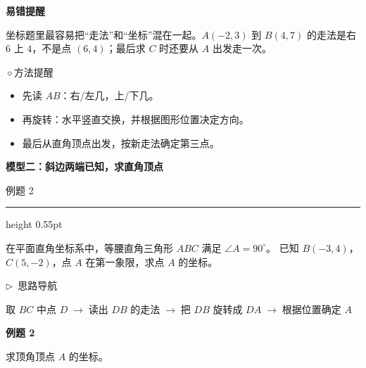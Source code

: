 \documentclass{exam-zh}
\newcommand{\edukai}{\kaishu}
\newcommand{\eduSectionTitle}[1]{%
  \needspace{5\baselineskip}%
  \vspace{2mm}
  {\color{edu-blue}\bfseries\large #1}\par
  \vspace{3mm}
}
\newcommand{\eduSubTitle}[1]{%
  \needspace{4\baselineskip}%
  \vspace{1mm}
  {\color{edu-blue}\bfseries #1}\par
  \vspace{1mm}
}
\newenvironment{eduSubQuestionItem}[1]{%
  \needspace{4\baselineskip}%
  \vspace{2mm}
  \par\noindent
  \hangindent=8mm\hangafter=1
  {\color{edu-blue}\bfseries #1}\enspace
  \begingroup
  \color{edu-ink}
}{%
  \endgroup
  \par
  \vspace{3mm}
}
\newenvironment{eduAuxItem}[1]{%
  \needspace{4\baselineskip}%
  \vspace{2mm}
  \par\noindent
  \hangindent=8mm\hangafter=1
  {\color{edu-blue}\edukai $\triangleright$~#1}\enspace
  \begingroup
  \color{edu-ink}
  \edukai
}{%
  \endgroup
  \par
  \vspace{4mm}
}
\newcommand{\eduIconPin}{\(\diamond\)}
\newenvironment{eduProblemBlock}[1][题目]{%
  \needspace{8\baselineskip}
  {\small\color{edu-muted}#1}\par
  \vspace{1.5mm}
  {\color{edu-blue}\hrule height 0.55pt}
  \vspace{4.5mm}
  \begingroup
  \color{edu-ink}
  \large
  \setlength{\parskip}{2.2mm}
  \linespread{1.20}\selectfont
}{%
  \par
  \endgroup
  \vspace{6mm}
}
\newenvironment{eduBulletList}{%
  \begin{itemize}[
    label=\textbullet,
    leftmargin=5mm,
    itemsep=1.2mm,
    topsep=0pt,
    parsep=0pt
  ]
}{%
  \end{itemize}
}
\begin{document}
\begin{eduMistakeBox}
\eduSubTitle{易错提醒}坐标题里最容易把“走法”和“坐标”混在一起。$A(-2,3)$ 到 $B(4,7)$ 的走法是右 $6$ 上 $4$，不是点 $(6,4)$；最后求 $C$ 时还要从 $A$ 出发走一次。
\end{eduMistakeBox}




\begin{eduSummaryBlock}{\eduIconPin}{方法提醒}
\begin{eduBulletList}
  \item 先读 $AB$：右/左几，上/下几。  \item 再旋转：水平竖直交换，并根据图形位置决定方向。  \item 最后从直角顶点出发，按新走法确定第三点。\end{eduBulletList}
\end{eduSummaryBlock}



\clearpage
\eduSectionTitle{模型二：斜边两端已知，求直角顶点}

\begin{eduProblemBlock}[例题 2]
在平面直角坐标系中，等腰直角三角形 $ABC$ 满足 $\angle A=90^\circ$。
已知 $B(-3,4)$，$C(5,-2)$，点 $A$ 在第一象限，求点 $A$ 的坐标。

\end{eduProblemBlock}





\begin{eduAuxItem}{思路导航}
取 $BC$ 中点 $D$$\;\to\;$读出 $DB$ 的走法$\;\to\;$把 $DB$ 旋转成 $DA$$\;\to\;$根据位置确定 $A$\end{eduAuxItem}




\begin{eduSubQuestionItem}{例题 2}
求顶角顶点 $A$ 的坐标。\end{eduSubQuestionItem}
\end{document}
